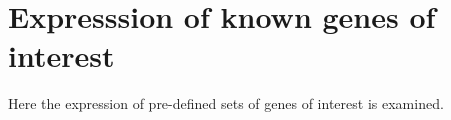 \section{Expresssion of known genes of interest}

Here the expression of pre-defined sets of genes of interest is examined.




\clearpage